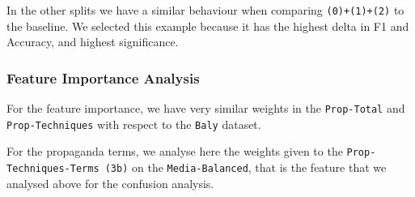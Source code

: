 In the other splits we have a similar behaviour when comparing \texttt{(0)+(1)+(2)} to the baseline. We selected this example because it has the highest delta in F1 and Accuracy, and highest significance.


\subsubsection{Feature Importance Analysis}

For the feature importance, we have very similar weights in the \texttt{Prop-Total} and \texttt{Prop-Techniques} with respect to the \texttt{Baly} dataset.

For the propaganda terms, we analyse here the weights given to the \texttt{Prop-Techniques-Terms (3b)} on the \texttt{Media-Balanced}, that is the feature that we analysed above for the confusion analysis.

